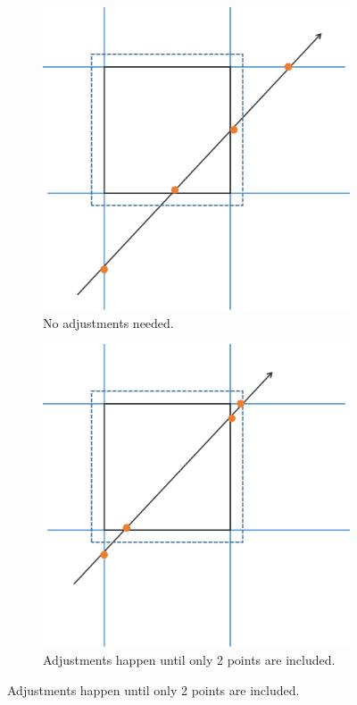\documentclass[12pt,a4paper]{article}
\begin{document}
\begin{figure}[p]
	\centering

	\begin{subfigure}[t]{0.45\textwidth}
		\centering
		\includegraphics[width=0.8\linewidth]{ray_ordinary}
		\caption{No adjustments needed.}
		\label{fig:ray_ordinary}
	\end{subfigure}
	\hfill
	\begin{subfigure}[t]{0.45\textwidth}
		\centering
		\includegraphics[width=0.8\linewidth]{ray_working}
		\caption{Adjustments happen until only 2 points are included.}
		\label{fig:ray_working}
	\end{subfigure}
	\medskip %


\end{figure}
\end{document}
